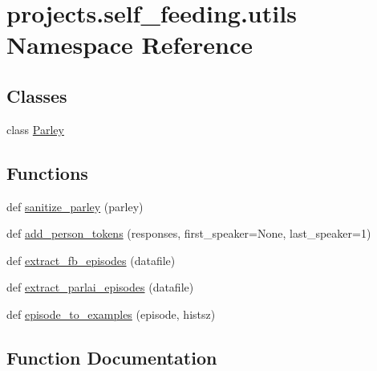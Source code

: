 \hypertarget{namespaceprojects_1_1self__feeding_1_1utils}{}\section{projects.\+self\+\_\+feeding.\+utils Namespace Reference}
\label{namespaceprojects_1_1self__feeding_1_1utils}
\subsection*{Classes}
\begin{DoxyCompactItemize}
\item 
class \hyperlink{classprojects_1_1self__feeding_1_1utils_1_1Parley}{Parley}
\end{DoxyCompactItemize}
\subsection*{Functions}
\begin{DoxyCompactItemize}
\item 
def \hyperlink{namespaceprojects_1_1self__feeding_1_1utils_a82b7afe0cb01d90b1de3724f3a6b23fb}{sanitize\+\_\+parley} (parley)
\item 
def \hyperlink{namespaceprojects_1_1self__feeding_1_1utils_a3f3d055dc6c4058057baae7b240de5ec}{add\+\_\+person\+\_\+tokens} (responses, first\+\_\+speaker=None, last\+\_\+speaker=1)
\item 
def \hyperlink{namespaceprojects_1_1self__feeding_1_1utils_a813014fa481008e57bf444f8a3f88d3e}{extract\+\_\+fb\+\_\+episodes} (datafile)
\item 
def \hyperlink{namespaceprojects_1_1self__feeding_1_1utils_a7bfa2fe610a2d0da7968b1a2662e0c23}{extract\+\_\+parlai\+\_\+episodes} (datafile)
\item 
def \hyperlink{namespaceprojects_1_1self__feeding_1_1utils_a4523d4a7c4da698dda134e32acebe320}{episode\+\_\+to\+\_\+examples} (episode, histsz)
\end{DoxyCompactItemize}


\subsection{Function Documentation}
\mbox{\label{namespaceprojects_1_1self__feeding_1_1utils_a3f3d055dc6c4058057baae7b240de5ec}} 
